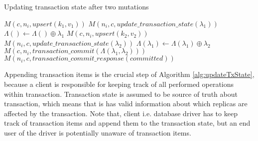 \begin{algorithm}
  \caption{Updating transaction state after two mutations}
  \label{alg:updateTxState}
  \begin{algorithmic}       
    \State \beginTransactionMessage
    \State \initialTxStateMessage
    \State $\mathit{M}(c, n_{i}, \mathit{upsert(k_{1},v_{1})})$
    \State $\mathit{M}(n_{i}, c, \mathit{update\_transaction\_state}(\lambda_{1}))$
    \State $\Lambda() \gets \Lambda() \oplus \lambda_{1}$
    \State $\mathit{M}(c, n_{i}, \mathit{upsert(k_{2},v_{2})})$
    \State $\mathit{M}(n_{i}, c, \mathit{update\_transaction\_state}(\lambda_{2}))$
    \State $\Lambda(\lambda_{1}) \gets \Lambda(\lambda_{1}) \oplus \lambda_{2}$
    \State $\mathit{M}(c, n_{i}, \mathit{transaction\_commit}(\Lambda(\lambda_{1}, \lambda_{2})))$
    \State $\mathit{M}(n_{i}, c, \mathit{transaction\_commit\_response}(committed))$    
  \end{algorithmic}
\end{algorithm}


Appending transaction items is the crucial step of Algorithm \ref{alg:updateTxState}, because a client is responsible for keeping track of all performed operations within transaction. Transaction state is assumed to be source of truth about transaction, which means that is has valid information about which replicas are affected by the transaction.
Note that, client i.e. database driver has to keep track of transaction items and append them to the transaction state, but an end user of the driver is potentially unaware of transaction items.

